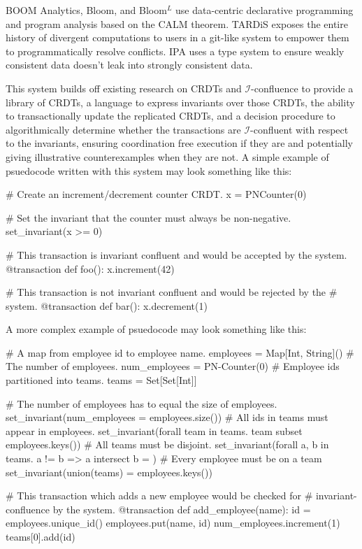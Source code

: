 \documentclass{tex/mjw}
\newcommand{\iinvariant}{\mathcal{I}}
\newcommand{\iconfluent}{$\iinvariant$-confluent}
\newcommand{\iconfluence}{$\iinvariant$-confluence}
\begin{document}
BOOM Analytics, Bloom, and Bloom$^L$ use data-centric declarative programming
and program analysis based on the CALM theorem. TARDiS exposes the entire
history of divergent computations to users in a git-like system to empower them
to programmatically resolve conflicts. IPA uses a type system to ensure weakly
consistent data doesn't leak into strongly consistent data.

This system builds off existing research on CRDTs and \iconfluence{} to provide
a library of CRDTs, a language to express invariants over those CRDTs, the
ability to transactionally update the replicated CRDTs, and a decision
procedure to algorithmically determine whether the transactions are
\iconfluent{} with respect to the invariants, ensuring coordination free
execution if they are and potentially giving illustrative counterexamples when
they are not. A simple example of psuedocode written with this system may look
something like this:

\begin{Python}
# Create an increment/decrement counter CRDT.
x = PNCounter(0)

# Set the invariant that the counter must always be non-negative.
set_invariant(x >= 0)

# This transaction is invariant confluent and would be accepted by the system.
@transaction
def foo():
  x.increment(42)

# This transaction is not invariant confluent and would be rejected by the
# system.
@transaction
def bar():
  x.decrement(1)
\end{Python}

A more complex example of psuedocode may look something like this:

\begin{Python}
# A map from employee id to employee name.
employees = Map[Int, String]()
# The number of employees.
num_employees = PN-Counter(0)
# Employee ids partitioned into teams.
teams = Set[Set[Int]]

# The number of employees has to equal the size of employees.
set_invariant(num_employees = employees.size())
# All ids in teams must appear in employees.
set_invariant(forall team in teams. team subset employees.keys())
# All teams must be disjoint.
set_invariant(forall a, b in teams. a != b => a intersect b = {})
# Every employee must be on a team
set_invariant(union(teams) = employees.keys())

# This transaction which adds a new employee would be checked for
# invariant-confluence by the system.
@transaction
def add_employee(name):
  id = employees.unique_id()
  employees.put(name, id)
  num_employees.increment(1)
  teams[0].add(id)
\end{Python}
\end{document}
